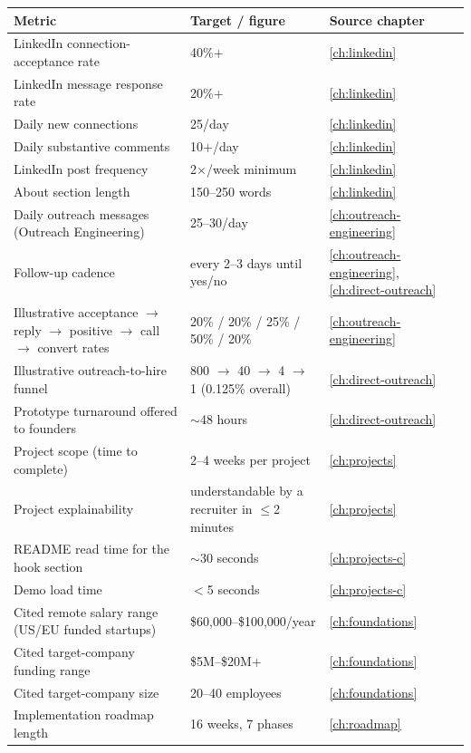 \begin{longtable}{p{} p{} p{}}
\toprule
\textbf{Metric} & \textbf{Target / figure} & \textbf{Source chapter} \\
\midrule
\endhead
LinkedIn connection-acceptance rate & 40\%+ & \ref{ch:linkedin} \\
LinkedIn message response rate & 20\%+ & \ref{ch:linkedin} \\
Daily new connections & 25/day & \ref{ch:linkedin} \\
Daily substantive comments & 10+/day & \ref{ch:linkedin} \\
LinkedIn post frequency & 2$\times$/week minimum & \ref{ch:linkedin} \\
About section length & 150--250 words & \ref{ch:linkedin} \\
Daily outreach messages (Outreach Engineering) & 25--30/day & \ref{ch:outreach-engineering} \\
Follow-up cadence & every 2--3 days until yes/no & \ref{ch:outreach-engineering}, \ref{ch:direct-outreach} \\
Illustrative acceptance $\rightarrow$ reply $\rightarrow$ positive $\rightarrow$ call $\rightarrow$ convert
rates & 20\% / 20\% / 25\% / 50\% / 20\% & \ref{ch:outreach-engineering} \\
Illustrative outreach-to-hire funnel & 800 $\rightarrow$ 40 $\rightarrow$ 4 $\rightarrow$ 1 (0.125\% overall) &
\ref{ch:direct-outreach} \\
Prototype turnaround offered to founders & $\sim$48 hours & \ref{ch:direct-outreach} \\
Project scope (time to complete) & 2--4 weeks per project & \ref{ch:projects} \\
Project explainability & understandable by a recruiter in $\le$2 minutes & \ref{ch:projects} \\
README read time for the hook section & $\sim$30 seconds & \ref{ch:projects-c} \\
Demo load time & $<$5 seconds & \ref{ch:projects-c} \\
Cited remote salary range (US/EU funded startups) & \$60,000--\$100,000/year & \ref{ch:foundations} \\
Cited target-company funding range & \$5M--\$20M+ & \ref{ch:foundations} \\
Cited target-company size & 20--40 employees & \ref{ch:foundations} \\
Implementation roadmap length & 16 weeks, 7 phases & \ref{ch:roadmap} \\

\end{longtable}
